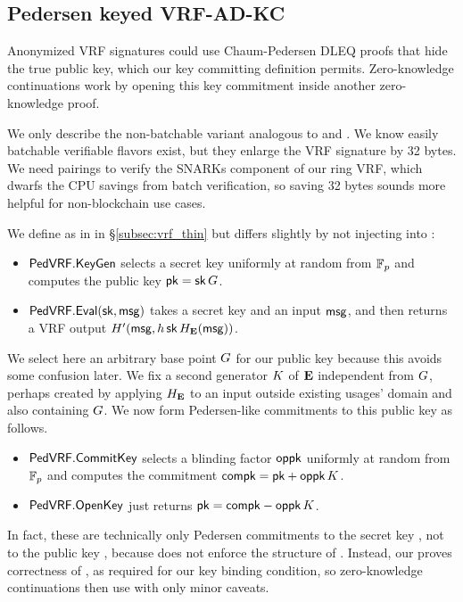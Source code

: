 \subsection{Pedersen keyed VRF-AD-KC}
\label{subsec:vrf_pederson}

Anonymized VRF signatures could use Chaum-Pedersen DLEQ proofs that
hide the true public key, which our key committing definition permits.
Zero-knowledge continuations work by opening this key commitment
 inside another zero-knowledge proof. %

We only describe the non-batchable variant analogous to
 \cite{nsec5} and \cite{VXEd25519}.
We know easily batchable verifiable flavors exist, but
 they enlarge the VRF signature by 32 bytes.
We need pairings to verify the SNARKs component of our ring VRF,
which dwarfs the CPU savings from batch verification,
so saving 32 bytes sounds more helpful for non-blockchain use cases.

\newcommand{\PedVRF}{\primalgo{PedVRF}} 

We define \KeyGen as in \ThinVRF in \S\ref{subsec:vrf_thin} but \Eval differs
slightly by not injecting \pk into \msg:
\begin{itemize}
\item $\PedVRF.\KeyGen$ selects a secret key \sk uniformly at random from $\mathbb{F}_p$ and computes the public key $\mathsf{pk} = \mathsf{sk} \, G$. 
\item $\PedVRF.\Eval(\sk,\msg)$ takes a secret key \sk and an input $\mathsf{msg}$, and
 then returns a VRF output $H'(\mathsf{msg},h \, \mathsf{sk} \, H_{{\mathbf{E}}}(\mathsf{msg}))$.
\end{itemize}

We select here an arbitrary base point $G$ for our public key
 because this avoids some confusion later.
%
We fix a second generator $K$ of ${\mathbf{E}}$ independent from $G$,
perhaps created by applying $H_{\mathbf{E}}$ to an input outside existing usages'
domain and also containing $G$. 
We now form Pedersen-like commitments to this public key \pk as follows.
\begin{itemize}
\item $\PedVRF.\CommitKey$ selects a blinding factor $\mathsf{oppk}$ uniformly
 at random from $\mathbb{F}_p$ and computes the commitment $\mathsf{compk} = \mathsf{pk} + \mathsf{oppk} \, K$.
\item $\PedVRF.\OpenKey$ just returns $\mathsf{pk} = \mathsf{compk} - \mathsf{oppk} \, K$.
\end{itemize}
In fact, these are technically only Pedersen commitments to
the secret key \sk, not to the public key \pk, because
 \OpenKey does not enforce the structure of \pk.
Instead, our \Verify proves correctness of \compk, as
 required for our key binding condition, so
zero-knowledge continuations then use \OpenKey with only minor caveats.

